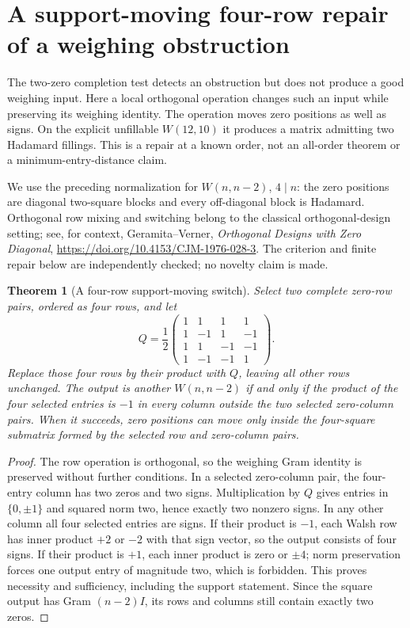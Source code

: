 \documentclass[11pt]{article}
\newtheorem{theorem}{Theorem}[section]
\begin{document}
\section{A support-moving four-row repair of a weighing obstruction}
\label{sec:weighing-switch-repair}

The two-zero completion test detects an obstruction but does not
produce a good weighing input. Here a local orthogonal operation
changes such an input while preserving its weighing identity.
The operation moves zero positions as well as signs. On the explicit
unfillable $W(12,10)$ it produces a matrix admitting two Hadamard
fillings. This is a repair at a known order, not an all-order theorem
or a minimum-entry-distance claim.

We use the preceding normalization for $W(n,n-2)$, $4\mid n$:
the zero positions are diagonal two-square blocks and every
off-diagonal block is Hadamard. Orthogonal row mixing and switching
belong to the classical orthogonal-design setting; see, for context,
Geramita--Verner, \emph{Orthogonal Designs with Zero Diagonal},
\url{https://doi.org/10.4153/CJM-1976-028-3}.
The criterion and finite repair below are independently checked;
no novelty claim is made.

\begin{theorem}[A four-row support-moving switch]
Select two complete zero-row pairs, ordered as four rows, and let
\[
 Q=\frac12\begin{pmatrix}
1&1&1&1\\1&-1&1&-1\\1&1&-1&-1\\1&-1&-1&1
\end{pmatrix}.
\]
Replace those four rows by their product with $Q$, leaving all
other rows unchanged. The output is another $W(n,n-2)$ if and
only if the product of the four selected entries is $-1$ in every
column outside the two selected zero-column pairs.
When it succeeds, zero positions can move only inside the four-square
submatrix formed by the selected row and zero-column pairs.
\end{theorem}
\begin{proof}
The row operation is orthogonal, so the weighing Gram identity is
preserved without further conditions. In a selected zero-column pair,
the four-entry column has two zeros and two signs. Multiplication
by $Q$ gives entries in $\{0,\pm1\}$ and squared norm two, hence
exactly two nonzero signs. In any other column all four selected
entries are signs. If their product is $-1$, each Walsh row has
inner product $+2$ or $-2$ with that sign vector, so the output
consists of four signs. If their product is $+1$, each inner product
is zero or $\pm4$; norm preservation forces one output entry of
magnitude two, which is forbidden. This proves necessity and
sufficiency, including the support statement. Since the square output
has Gram $(n-2)I$, its rows and columns still contain exactly two zeros.
\end{proof}
\end{document}

